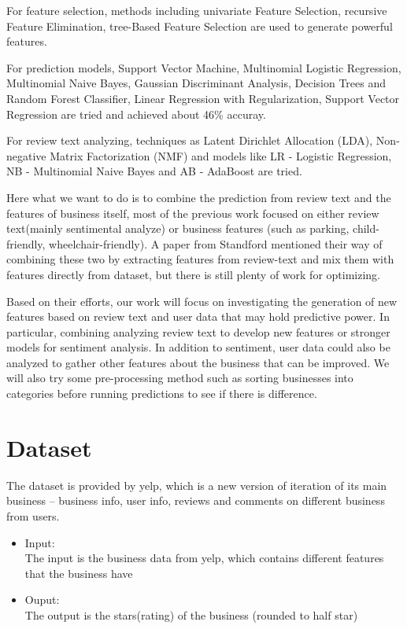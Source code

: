 \documentclass{article}
\begin{document}
For feature selection, methods including univariate Feature Selection, recursive Feature Elimination, tree-Based Feature Selection are used to generate powerful features. 

For prediction models, Support Vector Machine, Multinomial Logistic Regression, Multinomial Naive Bayes, Gaussian Discriminant Analysis, Decision Trees and Random Forest Classifier, Linear Regression with Regularization, Support Vector Regression are tried and achieved about 46\% accuray. \cite{YelpPrediction} 

For review text analyzing, techniques as Latent Dirichlet Allocation (LDA), Non-negative Matrix Factorization (NMF) and models like LR - Logistic Regression, NB - Multinomial Naive Bayes and  AB - AdaBoost are tried. \cite{yelpreviewtext} 

Here what we want to do is to combine the prediction from review text and the features of business itself, most of the previous work focused on either review text(mainly sentimental analyze) or business features (such as parking, child-friendly, wheelchair-friendly). A paper from Standford mentioned their way of combining these two by extracting features from review-text and mix them with features directly from dataset, but there is still plenty of work for optimizing. 

Based on their efforts, our work will focus on investigating the generation of new features based on review text and user data that may hold predictive power. In particular, combining analyzing review text to develop new features or stronger models for sentiment analysis. In addition to sentiment, user data could also be analyzed to gather other features about the business that can be improved. We will also try some pre-processing method such as sorting businesses into categories before running predictions to see if there is difference. 

\section{Dataset}
The dataset is provided by yelp, which is a new version of iteration of its main business -- business info, user info, reviews and comments on different business from users.
\begin{itemize}
\item Input:\hfill \\The input is the business data from yelp, which contains different features that the business have
\item Ouput:\hfill \\ The output is the stars(rating) of the business (rounded to half star)
\end{itemize}
\end{document}
